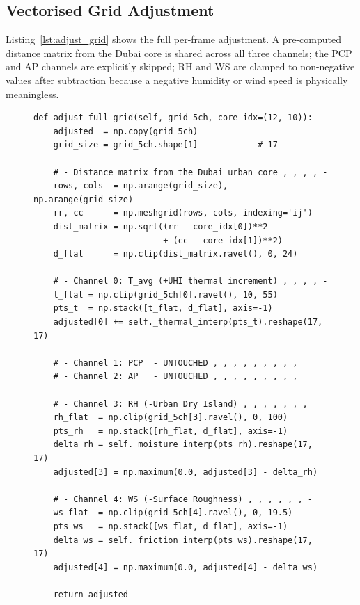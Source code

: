 \documentclass[conference]{IEEEtran}
\begin{document}
\subsection{Vectorised Grid Adjustment}

Listing~\ref{lst:adjust_grid} shows the full per-frame adjustment.  A
pre-computed distance matrix from the Dubai core is shared across all
three channels; the PCP and AP channels are explicitly skipped; RH and WS
are clamped to non-negative values after subtraction because a negative
humidity or wind speed is physically meaningless.

\begin{figure}[!t]
\begin{lstlisting}[caption={Vectorised multi-variable adjustment of a single
5-channel \(17\times 17\) grid frame.  Channels PCP and AP are deliberately
left untouched; RH and WS are clamped at zero after subtraction.},
label={lst:adjust_grid}]
def adjust_full_grid(self, grid_5ch, core_idx=(12, 10)):
    adjusted  = np.copy(grid_5ch)
    grid_size = grid_5ch.shape[1]            # 17

    # - Distance matrix from the Dubai urban core , , , , -
    rows, cols  = np.arange(grid_size), np.arange(grid_size)
    rr, cc      = np.meshgrid(rows, cols, indexing='ij')
    dist_matrix = np.sqrt((rr - core_idx[0])**2
                          + (cc - core_idx[1])**2)
    d_flat      = np.clip(dist_matrix.ravel(), 0, 24)

    # - Channel 0: T_avg (+UHI thermal increment) , , , , -
    t_flat = np.clip(grid_5ch[0].ravel(), 10, 55)
    pts_t  = np.stack([t_flat, d_flat], axis=-1)
    adjusted[0] += self._thermal_interp(pts_t).reshape(17, 17)

    # - Channel 1: PCP  - UNTOUCHED , , , , , , , , , 
    # - Channel 2: AP   - UNTOUCHED , , , , , , , , , 

    # - Channel 3: RH (-Urban Dry Island) , , , , , , , 
    rh_flat  = np.clip(grid_5ch[3].ravel(), 0, 100)
    pts_rh   = np.stack([rh_flat, d_flat], axis=-1)
    delta_rh = self._moisture_interp(pts_rh).reshape(17, 17)
    adjusted[3] = np.maximum(0.0, adjusted[3] - delta_rh)

    # - Channel 4: WS (-Surface Roughness) , , , , , , -
    ws_flat  = np.clip(grid_5ch[4].ravel(), 0, 19.5)
    pts_ws   = np.stack([ws_flat, d_flat], axis=-1)
    delta_ws = self._friction_interp(pts_ws).reshape(17, 17)
    adjusted[4] = np.maximum(0.0, adjusted[4] - delta_ws)

    return adjusted
\end{lstlisting}
\end{figure}
\end{document}

